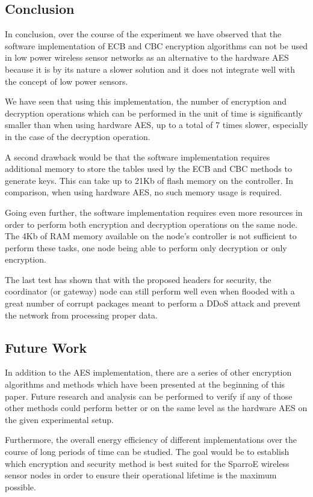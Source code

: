 \subsection{Conclusion}
In conclusion, over the course of the experiment we have observed that the 
software implementation of ECB and CBC encryption algorithms can not be used in low 
power wireless sensor networks as an alternative to the hardware AES because it 
is by its nature a slower solution and it does not integrate well with the 
concept of low power sensors.

We have seen that using this implementation, the number of encryption 
and decryption operations which can be performed in the unit of time 
is significantly smaller than when using hardware AES, up to a total 
of 7 times slower, especially in the case of the decryption operation.

A second drawback would be that the software implementation requires 
additional memory to store the tables used by the ECB and CBC methods 
to generate keys. This can take up to 21Kb of flash memory on the controller.
In comparison, when using hardware AES, no such memory usage is required.

Going even further, the software implementation requires even more resources 
in order to perform both encryption and decryption operations on the same node. The 4Kb of 
RAM memory available on the node's controller is not sufficient to perform these tasks, one node
being able to perform only decryption or only encryption.

The last test has shown that with the proposed headers for security, the coordinator (or 
gateway) node can still perform well even when flooded with a great number of corrupt 
packages meant to perform a DDoS attack and prevent the network from processing 
proper data.

\subsection{Future Work}
In addition to the AES implementation, there are a series of other encryption algorithms 
and methods which have been presented at the beginning of this paper. Future research and 
analysis can be performed to verify if any of those other methods could perform better or on 
the same level as the hardware AES on the given experimental setup.

Furthermore, the overall energy efficiency of different implementations over the course of 
long periods of time can be studied. The goal would be to establish which encryption and 
security method is best suited for the SparroE wireless sensor nodes in order to ensure 
their operational lifetime is the maximum possible.
